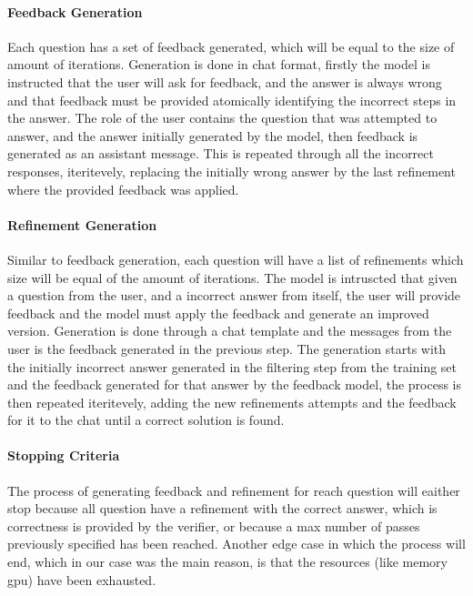 \documentclass[a4paper,10pt]{article}
\begin{document}
\paragraph{Feedback Generation}
Each question has a set of feedback generated, which will be equal to the size of amount of iterations. Generation is done in chat format, firstly the model is instructed that the user will ask for feedback, and the answer is always wrong and that feedback must  be provided atomically identifying the incorrect steps in the answer. The role of the user contains the question that was attempted to answer, and the answer initially generated by the model, then feedback is generated as an assistant message. This is repeated through all the incorrect responses, iteritevely, replacing the initially wrong answer by the last refinement where the provided feedback was applied.
\paragraph{Refinement Generation}
Similar to feedback generation, each question will have a list of refinements which size will be equal of the amount of iterations. The model is intruscted that given a question from the user, and a incorrect answer from itself, the user will provide feedback and the model must apply the feedback and generate an improved version. Generation is done through a chat template and the messages from the user is the feedback generated in the previous step. The generation starts with the initially incorrect answer generated in the filtering step from the training set and the feedback generated for that answer by the feedback model, the process is then repeated iteritevely, adding the new refinements  attempts and the feedback for it to the chat until a correct solution is found.
\paragraph{Stopping Criteria}
The process of generating feedback and refinement for reach question will eaither stop because all question have a refinement with the correct answer, which is correctness is provided by the verifier, or because a max number of passes previously specified has been reached. Another edge case in which the process will end, which in our case was the main reason, is that the resources (like memory gpu) have been exhausted.
\end{document}

